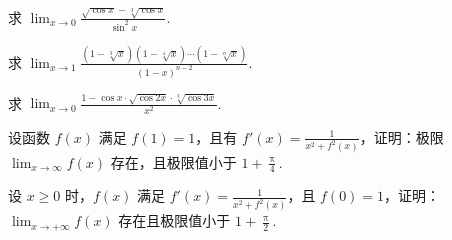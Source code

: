 	\begin{ti}
		求 $\lim_{x \to 0} \frac{ \sqrt{\cos x} - \sqrt[3]{\cos x} }{\sin^{2}x}$.
	\end{ti}

	\begin{ti}
		求 $\lim_{x \to 1} \frac{\left( 1 - \sqrt[3]{x} \right) \left( 1 - \sqrt[4]{x} \right) \cdots \left( 1 - \sqrt[n]{x} \right) }{(1 - x)^{n-2}}$.
	\end{ti}
	
	\begin{ti}
		求 $\lim_{x \to 0} \frac{1 - \cos x \cdot \sqrt{\cos 2x} \cdot \sqrt[3]{\cos 3x}}{x^{2}}$.
	\end{ti}

	\begin{ti}
		设函数 $f(x)$ 满足 $f(1) = 1$，且有 $f'(x) = \frac{1}{x^{2} + f^{2}(x)}$，证明：极限 $\lim_{x \to \infty} f(x)$ 存在，且极限值小于 $1 + \frac{\uppi}{4}$.
	\end{ti}

	\begin{ti}
		设 $x \geq 0$ 时，$f(x)$ 满足 $f'(x) = \frac{1}{x^{2} + f^{2}(x)}$，且 $f(0) = 1$，证明：$\lim_{x \to +\infty} f(x)$ 存在且极限值小于 $1 + \frac{\uppi}{2}$.
	\end{ti}